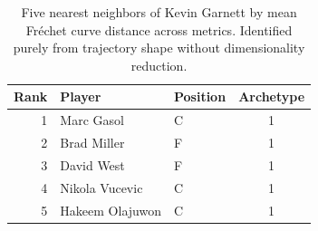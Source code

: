 \begin{table}[htbp]
  \centering\small
  \begin{tabular}{rllc}
    \toprule
    Rank & Player & Position & Archetype \\
    \midrule
    1 & Marc Gasol & C & 1 \\
    2 & Brad Miller & F & 1 \\
    3 & David West & F & 1 \\
    4 & Nikola Vucevic & C & 1 \\
    5 & Hakeem Olajuwon & C & 1 \\
    \bottomrule
  \end{tabular}
  \caption{Five nearest neighbors of Kevin Garnett by mean Fr\'{e}chet curve distance across metrics. Identified purely from trajectory shape without dimensionality reduction.}
  \label{tab:Kevin_Garnett_frechet_curve_neighbors}
\end{table}

